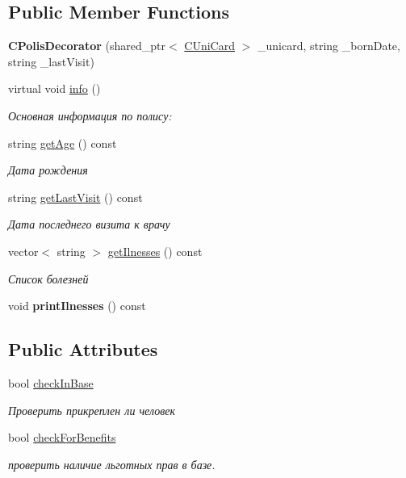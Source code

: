 \subsection*{Public Member Functions}
\begin{DoxyCompactItemize}
\item 
\mbox{\label{classCPolisDecorator_a7ae702036d0fc6d91178f25a4f00d64c}} 
{\bfseries C\+Polis\+Decorator} (shared\+\_\+ptr$<$ \hyperlink{classCUniCard}{C\+Uni\+Card} $>$ \+\_\+unicard, string \+\_\+born\+Date, string \+\_\+last\+Visit)
\item 
virtual void \hyperlink{classCPolisDecorator_a3e5c7651e0db69bfcc4a9b67e961b9a8}{info} ()
\begin{DoxyCompactList}\small\item\em Основная информация по полису\+: \end{DoxyCompactList}\item 
string \hyperlink{classCPolisDecorator_a9e380f2e7020eb4444a0bb3747380918}{get\+Age} () const
\begin{DoxyCompactList}\small\item\em Дата рождения \end{DoxyCompactList}\item 
string \hyperlink{classCPolisDecorator_afc603d0d42eb72689b103bd47ec225ce}{get\+Last\+Visit} () const
\begin{DoxyCompactList}\small\item\em Дата последнего визита к врачу \end{DoxyCompactList}\item 
vector$<$ string $>$ \hyperlink{classCPolisDecorator_ac43dd7017dc2a1dd70d2cf0431cc3e7f}{get\+Ilnesses} () const
\begin{DoxyCompactList}\small\item\em Список болезней \end{DoxyCompactList}\item 
\mbox{\label{classCPolisDecorator_a473a2c0b0bba20c7fc8575a7aae5a5ae}} 
void {\bfseries print\+Ilnesses} () const
\end{DoxyCompactItemize}
\subsection*{Public Attributes}
\begin{DoxyCompactItemize}
\item 
bool \hyperlink{classCPolisDecorator_adc7849b17854791c53ae1b18a7b445c6}{check\+In\+Base}
\begin{DoxyCompactList}\small\item\em Проверить прикреплен ли человек \end{DoxyCompactList}\item 
bool \hyperlink{classCPolisDecorator_a06749afa01826039c719984b3728860a}{check\+For\+Benefits}
\begin{DoxyCompactList}\small\item\em проверить наличие льготных прав в базе. \end{DoxyCompactList}\end{DoxyCompactItemize}


